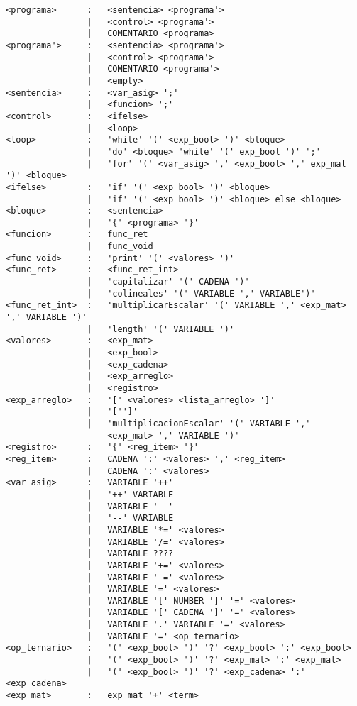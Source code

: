\begin{verbatim}
<programa>      :   <sentencia> <programa'>   
                |   <control> <programa'>   
                |   COMENTARIO <programa>   
<programa'>     :   <sentencia> <programa'>   
                |   <control> <programa'>   
                |   COMENTARIO <programa'>   
                |   <empty>
<sentencia>     :   <var_asig> ';'
                |   <funcion> ';'
<control>       :   <ifelse>
                |   <loop>
<loop>          :   'while' '(' <exp_bool> ')' <bloque>
                |   'do' <bloque> 'while' '(' exp_bool ')' ';' 
                |   'for' '(' <var_asig> ',' <exp_bool> ',' exp_mat ')' <bloque>
<ifelse>        :   'if' '(' <exp_bool> ')' <bloque>
                |   'if' '(' <exp_bool> ')' <bloque> else <bloque>
<bloque>        :   <sentencia>
                |   '{' <programa> '}'
<funcion>       :   func_ret
                |   func_void
<func_void>     :   'print' '(' <valores> ')'
<func_ret>      :   <func_ret_int>
                |   'capitalizar' '(' CADENA ')'
                |   'colineales' '(' VARIABLE ',' VARIABLE')'
<func_ret_int>  :   'multiplicarEscalar' '(' VARIABLE ',' <exp_mat> ',' VARIABLE ')'
                |   'length' '(' VARIABLE ')'
<valores>       :   <exp_mat>
                |   <exp_bool>
                |   <exp_cadena>
                |   <exp_arreglo>
                |   <registro>
<exp_arreglo>   :   '[' <valores> <lista_arreglo> ']'
                |   '['']'
                |   'multiplicacionEscalar' '(' VARIABLE ',' 
                    <exp_mat> ',' VARIABLE ')'
<registro>      :   '{' <reg_item> '}'
<reg_item>      :   CADENA ':' <valores> ',' <reg_item>
                |   CADENA ':' <valores> 
<var_asig>      :   VARIABLE '++'
                |   '++' VARIABLE
                |   VARIABLE '--'
                |   '--' VARIABLE
                |   VARIABLE '*=' <valores>
                |   VARIABLE '/=' <valores>
                |   VARIABLE ????
                |   VARIABLE '+=' <valores>
                |   VARIABLE '-=' <valores>
                |   VARIABLE '=' <valores>
                |   VARIABLE '[' NUMBER ']' '=' <valores>
                |   VARIABLE '[' CADENA ']' '=' <valores>
                |   VARIABLE '.' VARIABLE '=' <valores>
                |   VARIABLE '=' <op_ternario>
<op_ternario>   :   '(' <exp_bool> ')' '?' <exp_bool> ':' <exp_bool>
                |   '(' <exp_bool> ')' '?' <exp_mat> ':' <exp_mat>
                |   '(' <exp_bool> ')' '?' <exp_cadena> ':' <exp_cadena>
<exp_mat>       :   exp_mat '+' <term>

\end{verbatim}
